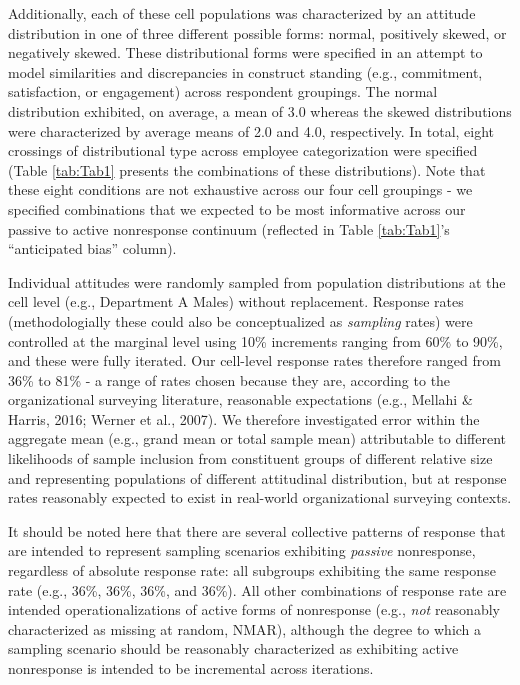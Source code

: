 \documentclass[
  ,man,floatsintext]{apa6}
\begin{document}
Additionally, each of these cell populations was characterized by an attitude distribution in one of three different possible forms: normal, positively skewed, or negatively skewed. These distributional forms were specified in an attempt to model similarities and discrepancies in construct standing (e.g., commitment, satisfaction, or engagement) across respondent groupings. The normal distribution exhibited, on average, a mean of 3.0 whereas the skewed distributions were characterized by average means of 2.0 and 4.0, respectively. In total, eight crossings of distributional type across employee categorization were specified (Table \ref{tab:Tab1} presents the combinations of these distributions). Note that these eight conditions are not exhaustive across our four cell groupings - we specified combinations that we expected to be most informative across our passive to active nonresponse continuum (reflected in Table \ref{tab:Tab1}'s ``anticipated bias'' column).

Individual attitudes were randomly sampled from population distributions at the cell level (e.g., Department A Males) without replacement. Response rates (methodologially these could also be conceptualized as \emph{sampling} rates) were controlled at the marginal level using 10\% increments ranging from 60\% to 90\%, and these were fully iterated. Our cell-level response rates therefore ranged from 36\% to 81\% - a range of rates chosen because they are, according to the organizational surveying literature, reasonable expectations (e.g., Mellahi \& Harris, 2016; Werner et al., 2007). We therefore investigated error within the aggregate mean (e.g., grand mean or total sample mean) attributable to different likelihoods of sample inclusion from constituent groups of different relative size and representing populations of different attitudinal distribution, but at response rates reasonably expected to exist in real-world organizational surveying contexts.

It should be noted here that there are several collective patterns of response that are intended to represent sampling scenarios exhibiting \emph{passive} nonresponse, regardless of absolute response rate: all subgroups exhibiting the same response rate (e.g., 36\%, 36\%, 36\%, and 36\%). All other combinations of response rate are intended operationalizations of active forms of nonresponse (e.g., \emph{not} reasonably characterized as missing at random, NMAR), although the degree to which a sampling scenario should be reasonably characterized as exhibiting active nonresponse is intended to be incremental across iterations.
\end{document}
